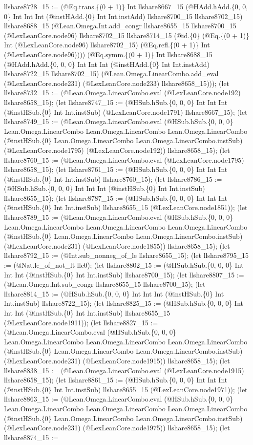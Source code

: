 \documentclass[11pt]{article}
\begin{document}
llshare8728\_15 := (@Eq.trans.\{(0 + 1)\} Int llshare8667\_15 (@HAdd.hAdd.\{0, 0, 0\} Int Int Int (@instHAdd.\{0\} Int Int.instAdd) llshare8700\_15 llshare8702\_15) llshare8688\_15 (@Lean.Omega.Int.add\_congr llshare8655\_15 llshare8700\_15 (@LexLeanCore.node96) llshare8702\_15 llshare8714\_15 (@id.\{0\} (@Eq.\{(0 + 1)\} Int (@LexLeanCore.node96) llshare8702\_15) (@Eq.refl.\{(0 + 1)\} Int (@LexLeanCore.node96)))) (@Eq.symm.\{(0 + 1)\} Int llshare8688\_15 (@HAdd.hAdd.\{0, 0, 0\} Int Int Int (@instHAdd.\{0\} Int Int.instAdd) llshare8722\_15 llshare8702\_15) (@Lean.Omega.LinearCombo.add\_eval (@LexLeanCore.node231) (@LexLeanCore.node233) llshare8658\_15))); (let llshare8732\_15 := (@Lean.Omega.LinearCombo.eval (@LexLeanCore.node192) llshare8658\_15); (let llshare8747\_15 := (@HSub.hSub.\{0, 0, 0\} Int Int Int (@instHSub.\{0\} Int Int.instSub) (@LexLeanCore.node1791) llshare8667\_15); (let llshare8749\_15 := (@Lean.Omega.LinearCombo.eval (@HSub.hSub.\{0, 0, 0\} Lean.Omega.LinearCombo Lean.Omega.LinearCombo Lean.Omega.LinearCombo (@instHSub.\{0\} Lean.Omega.LinearCombo Lean.Omega.LinearCombo.instSub) (@LexLeanCore.node1795) (@LexLeanCore.node192)) llshare8658\_15); (let llshare8760\_15 := (@Lean.Omega.LinearCombo.eval (@LexLeanCore.node1795) llshare8658\_15); (let llshare8761\_15 := (@HSub.hSub.\{0, 0, 0\} Int Int Int (@instHSub.\{0\} Int Int.instSub) llshare8760\_15); (let llshare8786\_15 := (@HSub.hSub.\{0, 0, 0\} Int Int Int (@instHSub.\{0\} Int Int.instSub) llshare8655\_15); (let llshare8787\_15 := (@HSub.hSub.\{0, 0, 0\} Int Int Int (@instHSub.\{0\} Int Int.instSub) llshare8655\_15 (@LexLeanCore.node1851)); (let llshare8789\_15 := (@Lean.Omega.LinearCombo.eval (@HSub.hSub.\{0, 0, 0\} Lean.Omega.LinearCombo Lean.Omega.LinearCombo Lean.Omega.LinearCombo (@instHSub.\{0\} Lean.Omega.LinearCombo Lean.Omega.LinearCombo.instSub) (@LexLeanCore.node231) (@LexLeanCore.node1855)) llshare8658\_15); (let llshare8792\_15 := (@Int.sub\_nonneg\_of\_le llshare8655\_15); (let llshare8795\_15 := (@Nat.le\_of\_not\_lt llc0); (let llshare8802\_15 := (@HSub.hSub.\{0, 0, 0\} Int Int Int (@instHSub.\{0\} Int Int.instSub) llshare8700\_15); (let llshare8807\_15 := (@Lean.Omega.Int.sub\_congr llshare8655\_15 llshare8700\_15); (let llshare8814\_15 := (@HSub.hSub.\{0, 0, 0\} Int Int Int (@instHSub.\{0\} Int Int.instSub) llshare8722\_15); (let llshare8825\_15 := (@HSub.hSub.\{0, 0, 0\} Int Int Int (@instHSub.\{0\} Int Int.instSub) llshare8655\_15 (@LexLeanCore.node1911)); (let llshare8827\_15 := (@Lean.Omega.LinearCombo.eval (@HSub.hSub.\{0, 0, 0\} Lean.Omega.LinearCombo Lean.Omega.LinearCombo Lean.Omega.LinearCombo (@instHSub.\{0\} Lean.Omega.LinearCombo Lean.Omega.LinearCombo.instSub) (@LexLeanCore.node231) (@LexLeanCore.node1915)) llshare8658\_15); (let llshare8838\_15 := (@Lean.Omega.LinearCombo.eval (@LexLeanCore.node1915) llshare8658\_15); (let llshare8861\_15 := (@HSub.hSub.\{0, 0, 0\} Int Int Int (@instHSub.\{0\} Int Int.instSub) llshare8655\_15 (@LexLeanCore.node1971)); (let llshare8863\_15 := (@Lean.Omega.LinearCombo.eval (@HSub.hSub.\{0, 0, 0\} Lean.Omega.LinearCombo Lean.Omega.LinearCombo Lean.Omega.LinearCombo (@instHSub.\{0\} Lean.Omega.LinearCombo Lean.Omega.LinearCombo.instSub) (@LexLeanCore.node231) (@LexLeanCore.node1975)) llshare8658\_15); (let llshare8874\_15 := 
\end{document}

